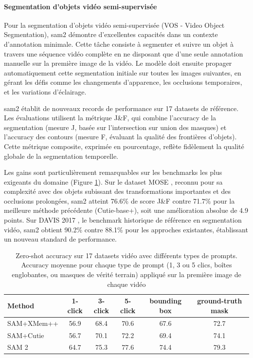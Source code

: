 \paragraph{Segmentation d'objets vidéo semi-supervisée}
Pour la segmentation d'objets vidéo semi-supervisée (VOS - Video Object Segmentation), \acrshort{sam2} démontre d'excellentes capacités dans un contexte d'annotation minimale. Cette tâche consiste à segmenter et suivre un objet à travers une séquence vidéo complète en ne disposant que d'une seule annotation manuelle sur la première image de la vidéo. Le modèle doit ensuite propager automatiquement cette segmentation initiale sur toutes les images suivantes, en gérant les défis comme les changements d'apparence, les occlusions temporaires, et les variations d'éclairage.

\acrshort{sam2} établit de nouveaux records de performance sur 17 datasets de référence. Les évaluations utilisent la métrique J\&F, qui combine l'accuracy de la segmentation (mesure J, basée sur l'intersection sur union des masques) et l'accuracy des contours (mesure F, évaluant la qualité des frontières d'objets). Cette métrique composite, exprimée en pourcentage, reflète fidèlement la qualité globale de la segmentation temporelle.

Les gains sont particulièrement remarquables sur les benchmarks les plus exigeants du domaine (Figure \ref{tab:ch2_sam2_resultats_sam2_vos_zeroshot}). Sur le dataset MOSE \cite{noauthor_mose_nodate}, reconnu pour sa complexité avec des objets subissant des transformations importantes et des occlusions prolongées, \acrshort{sam2} atteint 76.6\% de score J\&F contre 71.7\% pour la meilleure méthode précédente (Cutie-base+), soit une amélioration absolue de 4.9 points. Sur DAVIS 2017 \cite{noauthor_davis_nodate}, le benchmark historique de référence en segmentation vidéo, \acrshort{sam2} obtient 90.2\% contre 88.1\% pour les approches existantes, établissant un nouveau standard de performance.

\begin{table}[H]
    \centering
    \begin{tabular}{lccccc}
        \hline
        Method & 1-click & 3-click & 5-click & bounding box & ground-truth mask \\
        \hline
        SAM+XMem++ & 56.9 & 68.4 & 70.6 & 67.6 & 72.7 \\
        SAM+Cutie & 56.7 & 70.1 & 72.2 & 69.4 & 74.1 \\
        SAM 2 & 64.7 & 75.3 & 77.6 & 74.4 & 79.3 \\
        \hline
    \end{tabular}
    \caption{Zero-shot accuracy sur 17 datasets vidéo avec différents types de prompts. Accuracy moyenne pour chaque type de prompt (1, 3 ou 5 clics, boîtes englobantes, ou masques de vérité terrain) appliqué sur la première image de chaque vidéo \cite{ravi_sam_2024}}
    \label{tab:ch2_sam2_resultats_sam2_vos_zeroshot}
\end{table}

